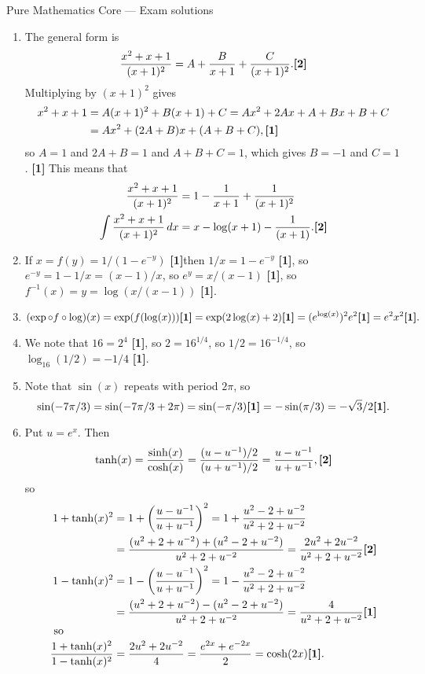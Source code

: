 \documentclass{amsart}
\renewcommand{\:}       {\colon}
\newcommand{\mks}[1]    {\mbox{\bf [#1]}}
\newcommand{\mk}        {\mbox{\bf [1]}}
\begin{document}

\begin{center}
{\Large Pure Mathematics Core --- Exam solutions}
\end{center}

\renewcommand{\theenumi}{A\arabic{enumi}}

\begin{enumerate}
 \item %
  The general form is
  \[ \frac{x^2+x+1}{(x+1)^2} = A + \frac{B}{x+1} + \frac{C}{(x+1)^2}.\mks{2}
  \]
  Multiplying by $(x+1)^2$ gives
  \begin{align*}
   x^2+x+1 &= A(x+1)^2 + B(x+1) + C  = Ax^2 +2Ax + A + Bx + B + C \\
           &= Ax^2 + (2A+B)x + (A+B+C), \mk
  \end{align*}
  so $A=1$ and $2A+B=1$ and $A+B+C=1$, which gives $B=-1$ and $C=1$. \mk
  This means that
  \begin{align*}
   \frac{x^2+x+1}{(x+1)^2} &= 1 - \frac{1}{x+1} + \frac{1}{(x+1)^2} \\
   \int \frac{x^2+x+1}{(x+1)^2}\,dx &= x - \log(x+1) - \frac{1}{(x+1)}.\mks{2}
  \end{align*}

 \item %
  If $x=f(y)=1/(1-e^{-y})$ \mk then $1/x=1-e^{-y}$ \mk, so
  $e^{-y}=1-1/x=(x-1)/x$, so $e^y=x/(x-1)$ \mk, so
  $f^{-1}(x)=y=\log(x/(x-1))$ \mk. 

 \item %
  \[ (\exp\circ f\circ\log)(x) = \exp(f(\log(x))) \mk = 
      \exp(2\log(x)+2) \mk = (e^{\log(x)})^2 e^2 \mk = e^2x^2 \mk.
  \]

 \item %
  We note that $16=2^4$ \mk, so $2=16^{1/4}$, so $1/2=16^{-1/4}$, so
  $\log_{16}(1/2)=-1/4$ \mk. 

 \item %
  Note that $\sin(x)$ repeats with period $2\pi$, so
  \[ \sin(-7\pi/3) = \sin(-7\pi/3+2\pi) = \sin(-\pi/3) \mk
      = -\sin(\pi/3) = -\sqrt{3}/2 \mk.
  \]

 \item %
  Put $u=e^x$.  Then 
  \[ \tanh(x) = \frac{\sinh(x)}{\cosh(x)} = 
      \frac{(u-u^{-1})/2}{(u+u^{-1})/2} = \frac{u-u^{-1}}{u+u^{-1}}, \mks{2}
  \]
  so
  \begin{align*}
   1+\tanh(x)^2 &= 
    1 + \left(\frac{u-u^{-1}}{u+u^{-1}}\right)^2 = 
    1 + \frac{u^2-2+u^{-2}}{u^2+2+u^{-2}} \\
    &= \frac{(u^2+2+u^{-2})+(u^2-2+u^{-2})}{u^2+2+u^{-2}} = 
       \frac{2u^2+2u^{-2}}{u^2+2+u^{-2}} \mks{2} \\
   1-\tanh(x)^2 &= 
    1 - \left(\frac{u-u^{-1}}{u+u^{-1}}\right)^2 = 
    1 - \frac{u^2-2+u^{-2}}{u^2+2+u^{-2}} \\
    &= \frac{(u^2+2+u^{-2})-(u^2-2+u^{-2})}{u^2+2+u^{-2}} = 
       \frac{4}{u^2+2+u^{-2}} \mk \\
\intertext{ so }
   \frac{1+\tanh(x)^2}{1-\tanh(x)^2} &= 
    \frac{2u^2+2u^{-2}}{4} = \frac{e^{2x}+e^{-2x}}{2} = \cosh(2x) \mk.
  \end{align*}


\end{enumerate}
\end{document}
